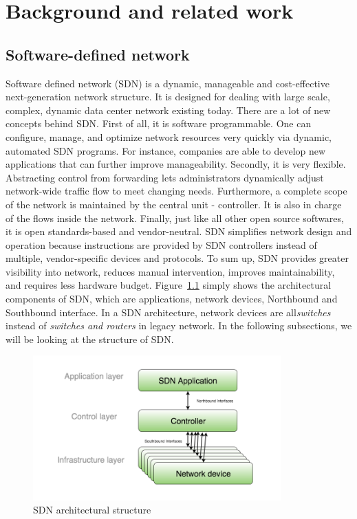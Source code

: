 \chapter{Background and related work}

\section{Software-defined network}
\label{Software-defined network}
Software defined network (SDN) is a dynamic, manageable and cost-effective next-generation network structure. It is designed for dealing with large scale, complex, dynamic data center network existing today. There are a lot of new concepts behind SDN. First of all, it is software programmable. One can configure, manage, and optimize network resources very quickly via dynamic, automated SDN programs. For instance, companies are able to develop new applications that can further improve manageability. Secondly, it is very flexible. Abstracting control from forwarding lets administrators dynamically adjust network-wide traffic flow to meet changing needs. Furthermore, a complete scope of the network is maintained by the central unit - controller. It is also in charge of the flows inside the network. Finally, just like all other open source softwares, it is open standards-based and vendor-neutral. SDN simplifies network design and operation because instructions are provided by SDN controllers instead of multiple, vendor-specific devices and protocols. To sum up, SDN provides greater visibility into network, reduces manual intervention, improves maintainability, and requires less hardware budget. Figure~\ref{SDN_struct} simply shows the architectural components of SDN, which are applications, network devices, Northbound and Southbound interface. In a SDN architecture, network devices are all\textit{switches} instead of \textit{switches and routers} in legacy network. In the following subsections, we will be looking at the structure of SDN.

\begin{figure}[H]
\begin{center} 
\includegraphics[width=0.85\textwidth]{figures/SDN_structure.png}
\end{center}
\caption{SDN architectural structure}
\label{SDN_struct}
\end{figure}

